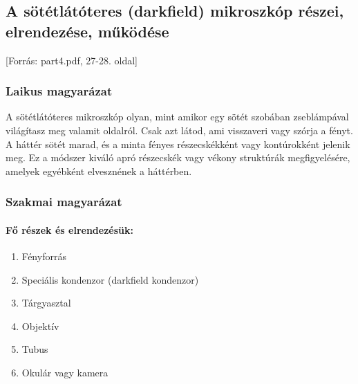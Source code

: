 \documentclass[a4paper,12pt]{article}
\begin{document}
\subsection{A sötétlátóteres (darkfield) mikroszkóp részei, elrendezése, működése} [Forrás: part4.pdf, 27-28. oldal]

\subsubsection{Laikus magyarázat} A sötétlátóteres mikroszkóp olyan, mint amikor egy sötét szobában zseblámpával világítasz meg valamit oldalról. Csak azt látod, ami visszaveri vagy szórja a fényt. A háttér sötét marad, és a minta fényes részecskékként vagy kontúrokként jelenik meg. Ez a módszer kiváló apró részecskék vagy vékony struktúrák megfigyelésére, amelyek egyébként elvesznének a háttérben.

\subsubsection{Szakmai magyarázat}

\paragraph{Fő részek és elrendezésük:} \begin{enumerate} \item Fényforrás \item Speciális kondenzor (darkfield kondenzor) \item Tárgyasztal \item Objektív \item Tubus \item Okulár vagy kamera \end{enumerate}
\end{document}
